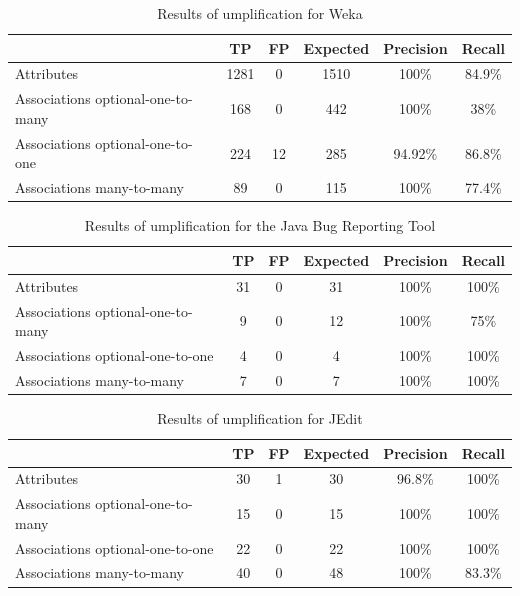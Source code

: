\begin{table}[h]
\caption{Results of umplification for Weka}
\label{table:umplifiedResultsSystems2}
\begin{tabularx}{\textwidth}{l|ccccc}
\toprule
\rowcolor[HTML]{BBDAFF}
\textbf{} & \textbf{TP}  & \textbf{FP}  & \textbf{Expected} & \textbf{Precision}  & \textbf{Recall}\\ \hline
Attributes & 1281	& 0	& 1510 & 100\%	& 84.9\% \\ \hline
Associations optional-one-to-many &  168 & 0 & 442 & 100\% & 38\% \\
Associations optional-one-to-one &  224 & 12 & 285 & 94.92\%  & 86.8\% \\ 
Associations many-to-many & 89 & 0 & 115 & 100\% & 77.4\% \\ 
\end{tabularx}
\end{table}

\begin{table}[h]
\caption{Results of umplification for the Java Bug Reporting Tool}
\label{table:umplifiedResultsSystems3}
\begin{tabularx}{\textwidth}{l|ccccc}
\toprule
\rowcolor[HTML]{BBDAFF}
\textbf{} & \textbf{TP}  & \textbf{FP}  & \textbf{Expected} & \textbf{Precision}  & \textbf{Recall}\\ \hline
Attributes & 31 & 0  & 31  & 100\% & 100\% \\ \hline
Associations optional-one-to-many &  9 & 0 & 12  & 100\%& 75\% \\
Associations optional-one-to-one &  4  & 0 & 4  & 100\% & 100\% \\ 
Associations many-to-many & 7 & 0 & 7 & 100\% & 100\%\\ 
\end{tabularx}
\end{table}

\begin{table}[h]
\caption{Results of umplification for JEdit}
\label{table:umplifiedResultsSystems4}
\begin{tabularx}{\textwidth}{l|ccccc}
\toprule
\rowcolor[HTML]{BBDAFF}
\textbf{} & \textbf{TP}  & \textbf{FP}  & \textbf{Expected} & \textbf{Precision}  & \textbf{Recall}\\ \hline
Attributes & 30  & 1 & 30 & 96.8\% & 100\%\\ \hline
Associations optional-one-to-many & 15  & 0 & 15  & 100\% & 100\% \\ 
Associations optional-one-to-one  &  22 & 0 & 22 & 100\% & 100\% \\
Associations many-to-many &  40 & 0 & 48  & 100\% & 83.3\% \\ 
\end{tabularx}
\end{table}

